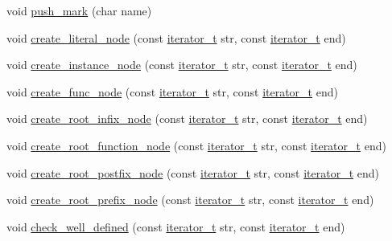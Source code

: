 \begin{DoxyCompactItemize}
void \hyperlink{namespacegenevalmag_a411fcac88bb0937d75b54d20601b6b33}{push\_\-mark} (char name)
\item 
void \hyperlink{namespacegenevalmag_a5acc69c06c112cad864e048a095396c5}{create\_\-literal\_\-node} (const \hyperlink{namespacegenevalmag_a64946721fb97e58be670a468bf8e7056}{iterator\_\-t} str, const \hyperlink{namespacegenevalmag_a64946721fb97e58be670a468bf8e7056}{iterator\_\-t} end)
\item 
void \hyperlink{namespacegenevalmag_a931db9fc9546a03ac92ae77ca4ad9f21}{create\_\-instance\_\-node} (const \hyperlink{namespacegenevalmag_a64946721fb97e58be670a468bf8e7056}{iterator\_\-t} str, const \hyperlink{namespacegenevalmag_a64946721fb97e58be670a468bf8e7056}{iterator\_\-t} end)
\item 
void \hyperlink{namespacegenevalmag_a2f41a8b96eb7d5bdca16a4924dcd020f}{create\_\-func\_\-node} (const \hyperlink{namespacegenevalmag_a64946721fb97e58be670a468bf8e7056}{iterator\_\-t} str, const \hyperlink{namespacegenevalmag_a64946721fb97e58be670a468bf8e7056}{iterator\_\-t} end)
\item 
void \hyperlink{namespacegenevalmag_a2a5aaaff7c3b3b8efc446903121a62c6}{create\_\-root\_\-infix\_\-node} (const \hyperlink{namespacegenevalmag_a64946721fb97e58be670a468bf8e7056}{iterator\_\-t} str, const \hyperlink{namespacegenevalmag_a64946721fb97e58be670a468bf8e7056}{iterator\_\-t} end)
\item 
void \hyperlink{namespacegenevalmag_abf7e87f4c01eacdac90dd0875d9e1f0a}{create\_\-root\_\-function\_\-node} (const \hyperlink{namespacegenevalmag_a64946721fb97e58be670a468bf8e7056}{iterator\_\-t} str, const \hyperlink{namespacegenevalmag_a64946721fb97e58be670a468bf8e7056}{iterator\_\-t} end)
\item 
void \hyperlink{namespacegenevalmag_ad2e6e0ea9f03843a2adb23ea4c43453f}{create\_\-root\_\-postfix\_\-node} (const \hyperlink{namespacegenevalmag_a64946721fb97e58be670a468bf8e7056}{iterator\_\-t} str, const \hyperlink{namespacegenevalmag_a64946721fb97e58be670a468bf8e7056}{iterator\_\-t} end)
\item 
void \hyperlink{namespacegenevalmag_a2947fff1246a0fbe137217896a658a5b}{create\_\-root\_\-prefix\_\-node} (const \hyperlink{namespacegenevalmag_a64946721fb97e58be670a468bf8e7056}{iterator\_\-t} str, const \hyperlink{namespacegenevalmag_a64946721fb97e58be670a468bf8e7056}{iterator\_\-t} end)
\item 
void \hyperlink{namespacegenevalmag_ac8f04dfdf39c964f9219cc5a7fb7197b}{check\_\-well\_\-defined} (const \hyperlink{namespacegenevalmag_a64946721fb97e58be670a468bf8e7056}{iterator\_\-t} str, const \hyperlink{namespacegenevalmag_a64946721fb97e58be670a468bf8e7056}{iterator\_\-t} end)

\end{DoxyCompactItemize}
